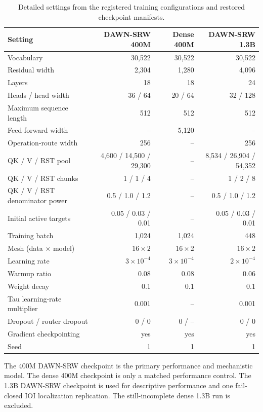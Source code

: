 \documentclass{article}
\newcommand{\DAWN}{DAWN-SRW}
\begin{document}
\begin{table}[h]
\centering
\caption{Detailed settings from the registered training configurations and
restored checkpoint manifests.}
\small
\begin{tabular}{lrrr}
\toprule
Setting & \DAWN{} 400M & Dense 400M & \DAWN{} 1.3B\\
\midrule
Vocabulary & 30,522 & 30,522 & 30,522\\
Residual width & 2,304 & 1,280 & 4,096\\
Layers & 18 & 18 & 24\\
Heads / head width & 36 / 64 & 20 / 64 & 32 / 128\\
Maximum sequence length & 512 & 512 & 512\\
Feed-forward width & -- & 5,120 & --\\
Operation-route width & 256 & -- & 256\\
QK / V / RST pool & 4,600 / 14,500 / 29,300 & -- &
8,534 / 26,904 / 54,352\\
QK / V / RST chunks & 1 / 1 / 4 & -- & 1 / 2 / 8\\
QK / V / RST denominator power & 0.5 / 1.0 / 1.2 & -- &
0.5 / 1.0 / 1.2\\
Initial active targets & 0.05 / 0.03 / 0.01 & -- &
0.05 / 0.03 / 0.01\\
Training batch & 1,024 & 1,024 & 448\\
Mesh (data \(\times\) model) & \(16\times2\) & \(16\times2\) & \(16\times2\)\\
Learning rate & \(3\times10^{-4}\) & \(3\times10^{-4}\) & \(2\times10^{-4}\)\\
Warmup ratio & 0.08 & 0.08 & 0.06\\
Weight decay & 0.1 & 0.1 & 0.1\\
Tau learning-rate multiplier & 0.001 & -- & 0.001\\
Dropout / router dropout & 0 / 0 & 0 / -- & 0 / 0\\
Gradient checkpointing & yes & yes & yes\\
Seed & 1 & 1 & 1\\
\bottomrule
\end{tabular}
\end{table}

The 400M \DAWN{} checkpoint is the primary performance and mechanistic model.
The dense 400M checkpoint is only a matched performance control. The 1.3B
\DAWN{} checkpoint is used for descriptive performance and one fail-closed IOI
localization replication. The still-incomplete dense 1.3B run is excluded.
\end{document}
